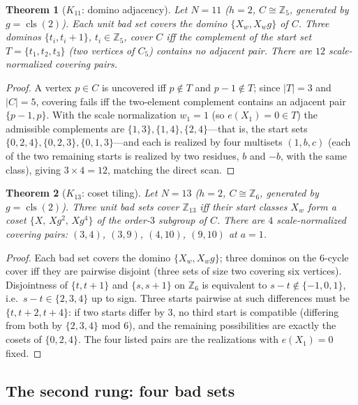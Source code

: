 \documentclass[11pt,a4paper]{article}
\numberwithin{equation}{section}
\theoremstyle{plain}
\newtheorem{theorem}{Theorem}[section]
\theoremstyle{definition}
\theoremstyle{remark}
\newcommand{\Z}{\mathbb{Z}}
\DeclareMathOperator{\cls}{cls}
\begin{document}
\begin{theorem}[$K_{11}$: domino adjacency]\label{thm:K11}
Let $N=11$ ($h=2$, $C\cong\Z_5$, generated by $g=\cls(2)$). Each unit
bad set covers the \emph{domino} $\{X_w,X_w g\}$ of $C$. Three dominos
$\{t_i,t_i+1\}$, $t_i\in\Z_5$, cover $C$ iff the complement of the start
set $T=\{t_1,t_2,t_3\}$ (two vertices of $C_5$) contains no adjacent
pair. There are $12$ scale-normalized covering pairs.
\end{theorem}

\begin{proof}
A vertex $p\in C$ is uncovered iff $p\notin T$ and $p-1\notin T$; since
$|T|=3$ and $|C|=5$, covering fails iff the two-element complement
contains an adjacent pair $\{p-1,p\}$. With the scale normalization
$w_1=1$ (so $e(X_1)=0\in T$) the admissible complements are
$\{1,3\},\{1,4\},\{2,4\}$---that is, the start sets
$\{0,2,4\},\{0,2,3\},\{0,1,3\}$---and each is realized by four
multisets $(1,b,c)$ (each of the two remaining starts is realized by two
residues, $b$ and $-b$, with the same class), giving $3\times 4=12$,
matching the direct scan.
\end{proof}

\begin{theorem}[$K_{13}$: coset tiling]\label{thm:K13}
Let $N=13$ ($h=2$, $C\cong\Z_6$, generated by $g=\cls(2)$). Three unit
bad sets cover $\Z_{13}$ iff their start classes $X_w$ form a coset
$\{X,\,Xg^2,\,Xg^4\}$ of the order-$3$ subgroup of $C$. There are $4$
scale-normalized covering pairs: $(3,4)$, $(3,9)$, $(4,10)$, $(9,10)$ at
$a=1$.
\end{theorem}

\begin{proof}
Each bad set covers the domino $\{X_w,X_wg\}$; three dominos on the
$6$-cycle cover iff they are pairwise disjoint (three sets of size two
covering six vertices). Disjointness of $\{t,t+1\}$ and $\{s,s+1\}$ on
$\Z_6$ is equivalent to $s-t\notin\{-1,0,1\}$, i.e.\ $s-t\in\{2,3,4\}$
up to sign. Three starts pairwise at such differences must be
$\{t,t+2,t+4\}$: if two starts differ by $3$, no third start is compatible
(differing from both by $\{2,3,4\}$ mod $6$), and the remaining
possibilities are exactly the cosets of $\{0,2,4\}$. The four listed
pairs are the realizations with $e(X_1)=0$ fixed.
\end{proof}

\subsection{The second rung: four bad sets}\label{sec:K5}
\end{document}
